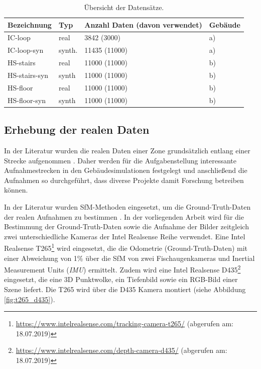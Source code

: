 \begin{table}[H]
	\centering
	\caption{Übersicht der Datensätze.}
	\begin{tabularx}{1.0\textwidth}{p{3.5cm} p{1.8cm} X  >{\centering\arraybackslash}p{1.7cm} }
		\textbf{Bezeichnung} & \textbf{Typ} & \textbf{Anzahl Daten} (davon verwendet) & \textbf{Gebäude}\\
		\hline
		IC-loop & real & 3842 (3000) & a) \\
		\hline
		IC-loop-syn & synth. & 11435 (11000) & a)\\
		\hline
		HS-stairs & real & 11000 (11000) & b)\\
		\hline
		HS-stairs-syn & synth & 11000 (11000) & b)\\
		\hline
		HS-floor & real & 11000 (11000) & b)\\
		\hline
		HS-floor-syn & synth & 11000 (11000) & b)\\
	\end{tabularx}
	\label{tab:datasets}
\end{table}

\cleardoublepage
\subsection{Erhebung der realen Daten}
\label{subsec:record_real_data}
In der Literatur wurden die realen Daten einer Zone grundsätzlich entlang einer Strecke aufgenommen \cite{kendallPoseNetConvolutionalNetwork2015, clarkVidLocDeepSpatioTemporal2017, acharyaBIMPoseNetIndoorCamera2019}. Daher werden für die Aufgabenstellung interessante Aufnahmestrecken in den Gebäudesimulationen festgelegt und anschließend die Aufnahmen so durchgeführt, dass diverse Projekte damit Forschung betreiben können. 

In der Literatur wurden SfM-Methoden eingesetzt, um die Ground-Truth-Daten der realen Aufnahmen zu bestimmen \cite{kendallPoseNetConvolutionalNetwork2015, clarkVidLocDeepSpatioTemporal2017, acharyaBIMPoseNetIndoorCamera2019}. 
In der vorliegenden Arbeit wird für die Bestimmung der Ground-Truth-Daten sowie die Aufnahme der Bilder zeitgleich zwei unterschiedliche Kameras der Intel Realsense Reihe verwendet. Eine Intel Realsense T265\footnote{\url{https://www.intelrealsense.com/tracking-camera-t265/} (abgerufen am: 18.07.2019)} wird eingesetzt, die die Odometrie (Ground-Truth-Daten) mit einer Abweichung von 1\%  über die SfM von zwei Fischaugenkameras und Inertial Measurement Units (\textit{IMU}) ermittelt. Zudem wird eine Intel Realsense D435\footnote{ \url{https://www.intelrealsense.com/depth-camera-d435/} (abgerufen am: 18.07.2019)} eingesetzt, die eine 3D Punktwolke, ein Tiefenbild sowie ein RGB-Bild einer Szene liefert. Die T265 wird über die D435 Kamera montiert (siehe Abbildung \ref{fig:t265_d435}). 

